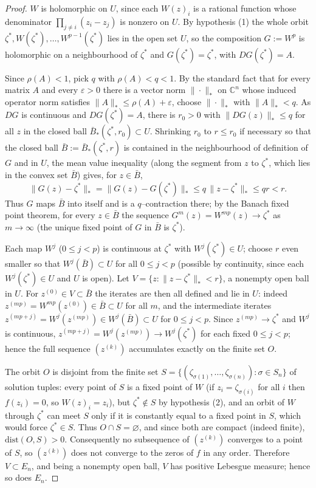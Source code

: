 \documentclass{amsart}
\theoremstyle{definition}
\theoremstyle{remark}
\newcommand{\C}{\mathbb{C}}
\begin{document}
\begin{proof}
$W$ is holomorphic on $U$, since each $W(z)_i$ is a rational function whose denominator
$\prod_{j\neq i}(z_i-z_j)$ is nonzero on $U$. By hypothesis (1) the whole orbit
$\zeta^{*},W(\zeta^{*}),\dots,W^{p-1}(\zeta^{*})$ lies in the open set $U$, so the
composition $G:=W^{p}$ is holomorphic on a neighbourhood of $\zeta^{*}$ and
$G(\zeta^{*})=\zeta^{*}$, with $DG(\zeta^{*})=A$.

Since $\rho(A)<1$, pick $q$ with $\rho(A)<q<1$. By the standard fact that for every matrix
$A$ and every $\varepsilon>0$ there is a vector norm $\|\cdot\|_{*}$ on $\C^n$ whose induced
operator norm satisfies $\|A\|_{*}\le\rho(A)+\varepsilon$, choose $\|\cdot\|_{*}$ with
$\|A\|_{*}<q$. As $DG$ is continuous and $DG(\zeta^{*})=A$, there is $r_0>0$ with
$\|DG(z)\|_{*}\le q$ for all $z$ in the closed ball $\bar B_{*}(\zeta^{*},r_0)\subset U$.
Shrinking $r_0$ to $r\le r_0$ if necessary so that the closed ball
$\bar B:=\bar B_{*}(\zeta^{*},r)$ is contained in the neighbourhood of definition of $G$ and
in $U$, the mean value inequality (along the segment from $z$ to $\zeta^{*}$, which lies in
the convex set $\bar B$) gives, for $z\in\bar B$,
\[
\|G(z)-\zeta^{*}\|_{*}=\|G(z)-G(\zeta^{*})\|_{*}\le q\,\|z-\zeta^{*}\|_{*}\le qr<r .
\]
Thus $G$ maps $\bar B$ into itself and is a $q$--contraction there; by the Banach fixed point
theorem, for every $z\in\bar B$ the sequence $G^{m}(z)=W^{mp}(z)\to\zeta^{*}$ as
$m\to\infty$ (the unique fixed point of $G$ in $\bar B$ is $\zeta^{*}$).

Each map $W^{j}$ ($0\le j<p$) is continuous at $\zeta^{*}$ with
$W^{j}(\zeta^{*})\in U$; choose $r$ even smaller so that $W^{j}(\bar B)\subset U$ for all
$0\le j<p$ (possible by continuity, since each $W^{j}(\zeta^{*})\in U$ and $U$ is open). Let
$V=\{z:\|z-\zeta^{*}\|_{*}<r\}$, a nonempty open ball in $U$. For $z^{(0)}\in V\subset\bar B$
the iterates are then all defined and lie in $U$: indeed $z^{(mp)}=W^{mp}(z^{(0)})\in\bar B
\subset U$ for all $m$, and the intermediate iterates $z^{(mp+j)}=W^{j}(z^{(mp)})\in
W^{j}(\bar B)\subset U$ for $0\le j<p$. Since $z^{(mp)}\to\zeta^{*}$ and $W^{j}$ is
continuous, $z^{(mp+j)}=W^{j}(z^{(mp)})\to W^{j}(\zeta^{*})$ for each fixed $0\le j<p$;
hence the full sequence $(z^{(k)})$ accumulates exactly on the finite set $O$.

The orbit $O$ is disjoint from the finite set
$S=\{(\zeta_{\sigma(1)},\dots,\zeta_{\sigma(n)}):\sigma\in S_n\}$ of solution tuples: every
point of $S$ is a fixed point of $W$ (if $z_i=\zeta_{\sigma(i)}$ for all $i$ then
$f(z_i)=0$, so $W(z)_i=z_i$), but $\zeta^{*}\notin S$ by hypothesis (2), and an orbit of $W$
through $\zeta^*$ can meet $S$ only if it is constantly equal to a fixed point in $S$, which
would force $\zeta^{*}\in S$. Thus $O\cap S=\varnothing$, and since both are compact (indeed
finite), $\mathrm{dist}(O,S)>0$. Consequently no subsequence of $(z^{(k)})$ converges to a
point of $S$, so $(z^{(k)})$ does not converge to the zeros of $f$ in any order. Therefore
$V\subset E_n$, and being a nonempty open ball, $V$ has positive Lebesgue measure; hence so
does $E_n$.
\end{proof}
\end{document}
